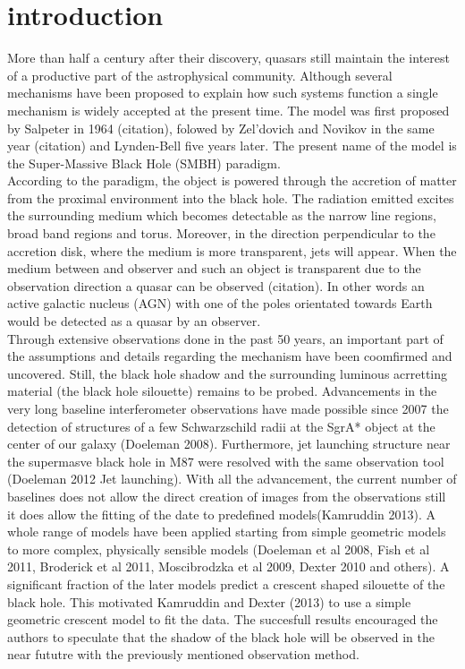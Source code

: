 \section{introduction}
More than half a century after their discovery, quasars still maintain the interest of a productive part of the astrophysical community. Although several mechanisms have been proposed 
to explain how such systems function a single mechanism is widely accepted at the present time. The model was first proposed by Salpeter in 1964 (citation), folowed by Zel'dovich and Novikov in the same year (citation) and Lynden-Bell five years later. The present name of the model is the Super-Massive Black Hole (SMBH) paradigm.\\

According to the paradigm, the object is powered through the accretion of matter from the proximal environment into the black hole. The radiation emitted excites the surrounding medium which becomes detectable as the narrow line regions,
broad band regions and torus. Moreover, in the direction perpendicular to the accretion disk, where the medium is more transparent, jets will appear. When the medium between and observer and such an object is transparent due to the observation direction  
a quasar can be observed (citation). In other words an active galactic nucleus (AGN) with one of the poles orientated towards Earth would be detected as a quasar by an observer. \\

Through extensive observations done in the past 50 years, an important part of the assumptions and details  regarding the mechanism have been coomfirmed and uncovered. Still, the black hole shadow and the surrounding luminous acrretting material (the black hole silouette) remains to be probed. Advancements in the very long baseline interferometer observations have made possible since 2007 the detection of structures of a few Schwarzschild radii at the SgrA* object at the center of our galaxy (Doeleman 2008). Furthermore, jet launching structure near the supermasve black hole in M87 were resolved with the same observation tool (Doeleman 2012 Jet launching). With all the advancement, the current number of baselines does not allow the direct creation of images from the observations still it does allow the fitting of the date to predefined models(Kamruddin 2013).
A whole range of models have been applied starting from simple geometric models to more complex, physically sensible models (Doeleman et al 2008, Fish et al 2011, Broderick et al 2011, Moscibrodzka et al 2009, Dexter 2010 and others). A significant fraction of the later models predict a crescent shaped silouette of the black hole. This motivated Kamruddin and Dexter (2013) to use a simple geometric crescent model to fit the data. The succesfull results encouraged the authors to speculate that the shadow of the black hole will be observed in the near fututre with the previously mentioned observation method. \\

